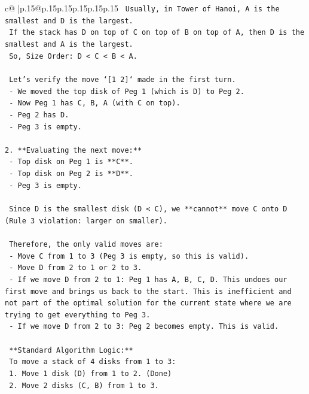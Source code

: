 \documentclass{article}
\begin{document}
{\begin{supertabular}{c@{$\;$}|p{.15\linewidth}@{}p{.15\linewidth}p{.15\linewidth}p{.15\linewidth}p{.15\linewidth}p{.15\linewidth}}
{{{\texttt{      Usually, in Tower of Hanoi, A is the smallest and D is the largest.} \\
\texttt{      If the stack has D on top of C on top of B on top of A, then D is the smallest and A is the largest.} \\
\texttt{      So, Size Order: D < C < B < A.} \\
\\ 
\texttt{      Let's verify the move `{[}1 2{]}` made in the first turn.} \\
\texttt{      {-} We moved the top disk of Peg 1 (which is D) to Peg 2.} \\
\texttt{      {-} Now Peg 1 has C, B, A (with C on top).} \\
\texttt{      {-} Peg 2 has D.} \\
\texttt{      {-} Peg 3 is empty.} \\
\\ 
\texttt{2.  **Evaluating the next move:**} \\
\texttt{    {-} Top disk on Peg 1 is **C**.} \\
\texttt{    {-} Top disk on Peg 2 is **D**.} \\
\texttt{    {-} Peg 3 is empty.} \\
\\ 
\texttt{    Since D is the smallest disk (D < C), we **cannot** move C onto D (Rule 3 violation: larger on smaller).} \\
\\ 
\texttt{    Therefore, the only valid moves are:} \\
\texttt{    {-} Move C from 1 to 3 (Peg 3 is empty, so this is valid).} \\
\texttt{    {-} Move D from 2 to 1 or 2 to 3.} \\
\texttt{      {-} If we move D from 2 to 1: Peg 1 has A, B, C, D. This undoes our first move and brings us back to the start. This is inefficient and not part of the optimal solution for the current state where we are trying to get everything to Peg 3.} \\
\texttt{      {-} If we move D from 2 to 3: Peg 2 becomes empty. This is valid.} \\
\\ 
\texttt{    **Standard Algorithm Logic:**} \\
\texttt{    To move a stack of 4 disks from 1 to 3:} \\
\texttt{    1. Move 1 disk (D) from 1 to 2. (Done)} \\
\texttt{    2. Move 2 disks (C, B) from 1 to 3.} \\
}}}
\end{supertabular}}
\end{document}
